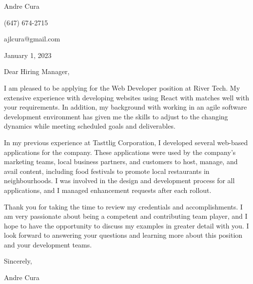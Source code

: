 \documentclass[letterpaper,12pt]{article}
\begin{document}
Andre Cura

(647) 674-2715

ajlcura@gmail.com

\vspace{0.5in}

January 1, 2023

\vspace{0.5in}

Dear Hiring Manager,

\vspace{0.5in}

I am pleased to be applying for the Web Developer position at River Tech.
My extensive experience with developing websites using React with
matches well with your requirements.
In addition, my background with working in an agile software development environment
has given me the skills to adjust to the changing dynamics
while meeting scheduled goals and deliverables.

\vspace{0.25in}

In my previous experience at Tasttlig Corporation,
I developed several web-based applications for the company.
These applications were used by the company's marketing teams, local business partners, and customers
to host, manage, and avail content, including food festivals to promote local restaurants in neighbourhoods.
I was involved in the design and development process for all applications,
and I managed enhancement requests after each rollout.

% 

\vspace{0.25in}

Thank you for taking the time to review my credentials and accomplishments.
I am very passionate about being a competent and contributing team player,
and I hope to have the opportunity to discuss my examples in greater detail with you.
I look forward to answering your questions and learning more about this position
and your development teams.

\vspace{0.5in}
Sincerely,

Andre Cura
\end{document}

